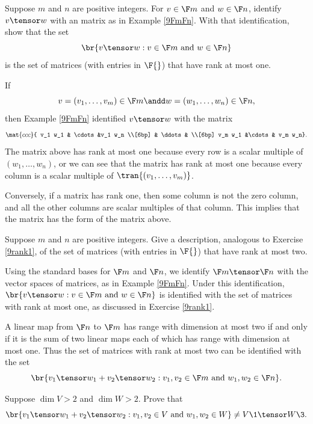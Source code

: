 \exercise
Suppose $m$ and $n$ are positive integers. For $v \in \F m$ and $w \in \F n$, identify $v \tensor w$ with an  matrix as in Example \ref{9FmFn}. With that identification, show that the set\label{9rank1}
\[
\br{ v \tensor w : v \in \F m \text{ and } w \in \F n }
\]
is the set of  matrices (with entries in $\F{}$) that have rank at most one.

\begin{Solution}
If
\[
v = (v_1, \ldots, v_m) \in \F m \andd w = (w_1, \ldots, w_n) \in \F n,
\]
then Example \ref{9FmFn} identified $v \tensor w$ with the  matrix
\[
\mat{ccc}{
v_1 w_1 & \cdots &v_1 w_n \\[6bp]
& \ddots & \\[6bp]
v_m w_1 &\cdots & v_m w_n}.
\]
The matrix above has rank at most one because every row is a scalar multiple of $(w_1, \ldots, w_n)$, or we can see that the matrix has rank at most one because every column is a scalar multiple of $\tran{(v_1, \ldots, v_m)}$.

Conversely, if a matrix has rank one, then some column is not the zero column, and all the other columns are scalar multiples of that column. This implies that the matrix has the form of the matrix above.
\end{Solution}

\exercise
Suppose $m$ and $n$ are positive integers. Give a description, analogous to Exercise \ref{9rank1}, of the set of  matrices (with entries in $\F{}$) that have rank at most two.\label{9rank2}

\begin{Solution}
Using the standard bases for $\F m$ and $\F n$, we identify $\F m \tensor \F n$ with the vector spaces of  matrices, as in Example \ref{9FmFn}. Under this identification, $\br{ v \tensor w : v \in \F m \text{ and } w \in \F n }$ is identified with the set of matrices with rank at most one, as discussed in Exercise \ref{9rank1}.

A linear map from $\F n$ to $\F m$ has range with dimension at most two if and only if it is the sum of  two linear maps each of which has range with dimension at most one. Thus the set of  matrices with rank at most two can be identified with the set
\[
\br{ v_1 \tensor w_1 + v_2 \tensor w_2 : v_1, v_2 \in \F m \text{ and } w_1, w_2  \in \F n }.
\]
\end{Solution}

\exercise
Suppose $\dim V > 2$ and $\dim W > 2$. Prove that
\[
\br{ v_1 \tensor w_1 + v_2 \tensor w_2 : v_1, v_2 \in V \text{ and } w_1, w_2 \in W } \ne V\1 \tensor W\3.
\]
\exercisedisplayend

